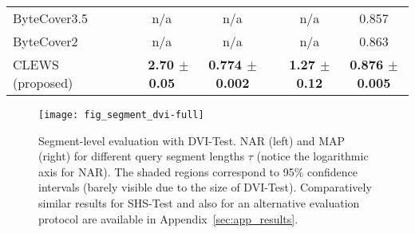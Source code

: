 \begin{table*}[t]
\begin{center}
\begin{small}
\begin{sc}
\begin{tabular}{llccccc}
ByteCover3.5~\cite{du_x-cover_2024}            & & n/a             & n/a             & & n/a           & 0.857\hspace{1.2cm} \\
ByteCover2~\cite{du_bytecover2_2022}           & & n/a             & n/a             & & n/a           & 0.863\hspace{1.2cm} \\
CLEWS (proposed)                               & & ~~\textbf{2.70 $\bm{\pm}$ 0.05} & \textbf{0.774 $\bm{\pm}$ 0.002} & & \textbf{1.27 $\bm{\pm}$ 0.12} & \textbf{0.876 $\bm{\pm}$ 0.005} \\
\bottomrule
\end{tabular}
\end{sc}
\end{small}
\end{center}
\end{table*}

\begin{figure*}[t]
\centerline{\texttt{[image: fig\_segment\_dvi-full]}}
\figurecaptionspace
\caption{Segment-level evaluation with DVI-Test. NAR (left) and MAP (right) for different query segment lengths $\tau$ (notice the logarithmic axis for NAR). The shaded regions correspond to 95\% confidence intervals (barely visible due to the size of DVI-Test). Comparatively similar results for SHS-Test and also for an alternative evaluation protocol are available in Appendix~\ref{sec:app_results}.}
\label{fig:seg_dvi}
\end{figure*}


